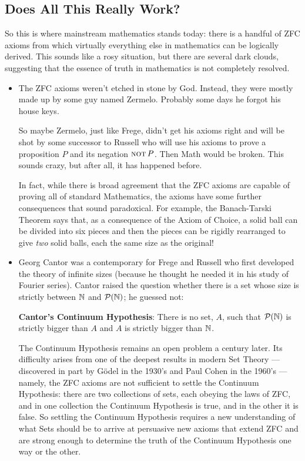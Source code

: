 \subsection{Does All This Really Work?}

So this is where mainstream mathematics stands today: there is a handful
of ZFC axioms from which virtually everything else in mathematics can be
logically derived.  This sounds like a rosy situation, but there are
several dark clouds, suggesting that the essence of truth in mathematics
is not completely resolved.

%
\begin{itemize}

\item The ZFC axioms weren't etched in stone by God.  Instead, they were
  mostly made up by some guy named Zermelo.  Probably some days he forgot
  his house keys.

  So maybe Zermelo, just like Frege, didn't get his axioms right and will
  be shot by some successor to Russell who will use his axioms to prove a
  proposition $P$ and its negation $\mathop{\mathrm{\textsc{not}}} P$.  Then Math would be broken.
  This sounds crazy, but after all, it has happened before.

  In fact, while there is broad agreement that the ZFC axioms are capable
  of proving all of standard Mathematics, the axioms have some further
  consequences that sound paradoxical.  For example, the Banach-Tarski
  Theorem says that, as a consequence of the Axiom of Choice, a solid ball
  can be divided into six pieces and then the pieces can be rigidly
  rearranged to give \textit{two} solid balls, each the same size as the
  original!

\item Georg Cantor was a contemporary for Frege and Russell who first
  developed the theory of infinite sizes (because he thought he needed it
  in his study of Fourier series).  Cantor raised the question whether
  there is a set whose size is strictly between $\mathbb{N}$ and
  $\mathcal{P}(\mathbb{N})$; he guessed not:

\textbf{Cantor's Continuum Hypothesis}: There is no set, $A$, such that
$\mathcal{P}(\mathbb{N})$ is strictly bigger than $A$ and $A$ is strictly bigger
than $\mathbb{N}$.

The Continuum Hypothesis remains an open problem a century later.  Its
difficulty arises from one of the deepest results in modern Set Theory
---discovered in part by G\"odel in the 1930's and Paul Cohen in the
1960's ---namely, the ZFC axioms are not sufficient to settle the
Continuum Hypothesis: there are two collections of sets, each obeying the
laws of ZFC, and in one collection the Continuum Hypothesis is true, and
in the other it is false.  So settling the Continuum Hypothesis requires a
new understanding of what Sets should be to arrive at persuasive new
axioms that extend ZFC and are strong enough to determine the truth of the
Continuum Hypothesis one way or the other.


\end{itemize}
